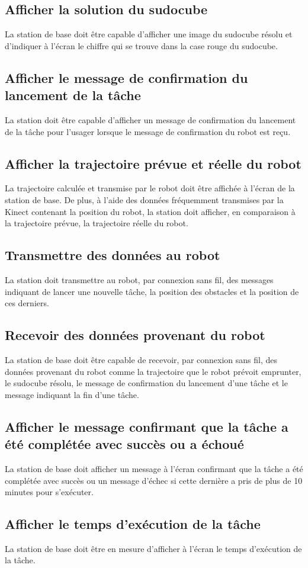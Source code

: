 \subsection{Afficher la solution du sudocube}
La station de base doit être capable d'afficher une image du sudocube résolu et d'indiquer à l'écran le chiffre qui se trouve dans la case rouge du sudocube.
\subsection{Afficher le message de confirmation du lancement de la tâche}
La station doit être capable d'afficher un message de confirmation du lancement de la tâche pour l'usager lorsque le message de confirmation du robot est reçu.
\subsection{Afficher la trajectoire prévue et réelle du robot}
La trajectoire calculée et transmise par le robot doit être affichée à l'écran de la station de base. De plus, à l'aide des données fréquemment transmises par la Kinect contenant la position du robot, la station doit afficher, en comparaison à la trajectoire prévue, la trajectoire réelle du robot.
\subsection{Transmettre des données au robot}
La station doit transmettre au robot, par connexion sans fil, des messages indiquant de lancer une nouvelle tâche, la position des obstacles et la position de ces derniers.
\subsection{Recevoir des données provenant du robot}
La station de base doit être capable de recevoir, par connexion sans fil, des données provenant du robot comme la trajectoire que le robot prévoit emprunter, le sudocube résolu, le message de confirmation du lancement d'une tâche et le message indiquant la fin d'une tâche.
\subsection{Afficher le message confirmant que la tâche a été complétée avec succès ou a échoué}
La station de base doit afficher un message à l'écran confirmant que la tâche a été complétée avec succès ou un message d'échec si cette dernière a pris de plus de 10 minutes pour s'exécuter.
\subsection{Afficher le temps d'exécution de la tâche}
La station de base doit être en mesure d'afficher à l'écran le temps d'exécution de la tâche.
